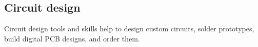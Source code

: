 \subsection{Circuit design}

Circuit design tools and skills help to design custom circuits,
solder prototypes, build digital PCB designs, and order them.
